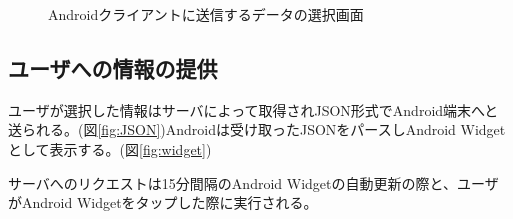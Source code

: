 \begin{figure}[htbp]
  \begin{minipage}{\hsize}
    \begin{center}
    \end{center}
    \caption{Androidクライアントに送信するデータの選択画面}
    \label{fig:select}
  \end{minipage}
\end{figure}

\subsection{ユーザへの情報の提供}
ユーザが選択した情報はサーバによって取得されJSON形式でAndroid端末へと送られる。(図\ref{fig:JSON})Androidは受け取ったJSONをパースしAndroid Widgetとして表示する。(図\ref{fig:widget})

サーバへのリクエストは15分間隔のAndroid Widgetの自動更新の際と、ユーザがAndroid Widgetをタップした際に実行される。

